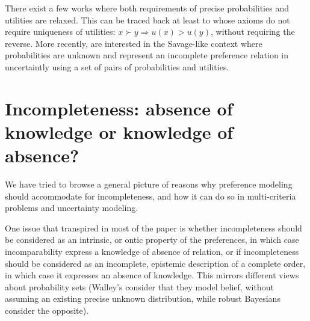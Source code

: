 \documentclass[french, english]{llncs}
\begin{document}
	There exist a few works where both requirements of precise probabilities and utilities are relaxed. This can be traced back at least to \citet{aumann_utility_1962} whose axioms do not require uniqueness of utilities: $x \succ y ⇒ u(x) > u(y)$, without requiring the reverse. More recently, \citet{galaabaatar_subjective_2013} are interested in the Savage-like context where probabilities are unknown and represent an incomplete preference relation in uncertaintly using a set of pairs of probabilities and utilities.


	\section{Incompleteness: absence of knowledge or knowledge of absence?}
	
	We have tried to browse a general picture of reasons why preference modeling should accommodate for incompleteness, and how it can do so in multi-criteria problems and uncertainty modeling. 
	
	One issue that transpired in most of the paper is whether incompleteness should be considered as an intrinsic, or ontic property of the preferences, in which case incomparability express a knowledge of absence of relation, or if incompleteness should be considered as an incomplete, epistemic description of a complete order, in which case it expresses an absence of knowledge. This mirrors different views about probability sets (Walley's consider that they model belief, without assuming an existing precise unknown distribution, while robust Bayesians consider the opposite). 
	
\end{document}
